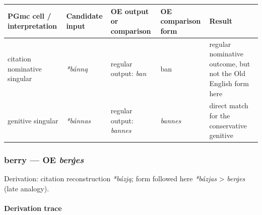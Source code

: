 \documentclass[
  british,
  a4paper,
]{article}
\newcounter{none} %
\begin{document}
{\def\LTcaptype{none} %
\begin{longtable}[]{@{}
  >{\raggedright\arraybackslash}p{}
  >{\raggedright\arraybackslash}p{}
  >{\raggedright\arraybackslash}p{}
  >{\raggedright\arraybackslash}p{}
  >{\raggedright\arraybackslash}p{}@{}}
\toprule\noalign{}
\begin{minipage}[b]{\linewidth}\raggedright
PGmc cell / interpretation
\end{minipage} & \begin{minipage}[b]{\linewidth}\raggedright
Candidate input
\end{minipage} & \begin{minipage}[b]{\linewidth}\raggedright
OE output or comparison
\end{minipage} & \begin{minipage}[b]{\linewidth}\raggedright
OE comparison form
\end{minipage} & \begin{minipage}[b]{\linewidth}\raggedright
Result
\end{minipage} \\
\midrule\noalign{}
\endhead
\bottomrule\noalign{}
\endlastfoot
citation nominative singular & {\emph{*bánną}} & regular output:
{\emph{ban}} & ban & regular nominative outcome, but not the Old English
form here \\
genitive singular & {\emph{*bánnas}} & regular output: \emph{bannes} &
{\emph{bannes}} & direct match for the conservative genitive \\
\end{longtable}
}

\subsubsection{\texorpdfstring{berry --- OE
\emph{berġes}}{berry --- OE berġes}}\label{berry-oe-berux121es}

Derivation: citation reconstruction \emph{*bázją}; form followed here
\emph{*bázjas} \textgreater{} \emph{berġes} (late analogy).

\paragraph{Derivation trace}\label{derivation-trace-123}
\end{document}
